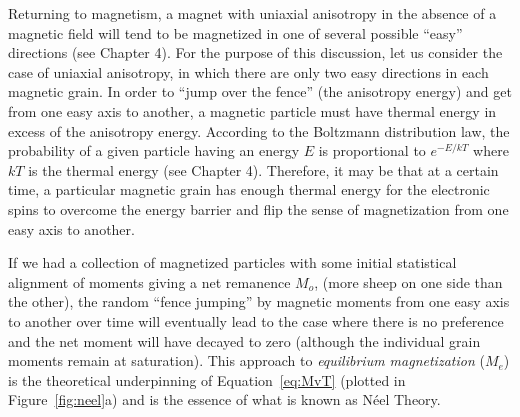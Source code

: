Returning to magnetism, a magnet with uniaxial anisotropy in the absence of a magnetic field will tend to be magnetized in one of several possible ``easy'' directions (see Chapter 4).  For the purpose of this discussion, let us consider the case of uniaxial anisotropy, in which there are only two easy directions in each magnetic grain.   In order to ``jump over the fence''  (the 
anisotropy energy) and get from one easy axis to another, a magnetic particle must have thermal energy in excess of the anisotropy energy.  According to the 
Boltzmann distribution law, the probability of a given particle having an energy $E$ is proportional to $e^{ -E/kT}$ where $kT$ is the 
thermal energy (see Chapter 4).   Therefore, it may be that at a certain time, a particular magnetic grain has enough thermal energy for the electronic spins to overcome the energy barrier and flip the sense of magnetization from one easy axis to another.  

If we had a collection of magnetized particles with some initial statistical alignment of moments giving a net remanence $M_o$, (more sheep on one side than the other),  the random ``fence jumping'' by magnetic moments from one easy axis to another over time will eventually lead to the case where there is no preference and the net  moment will have decayed to zero (although the individual grain moments remain at saturation).    This approach to 
{\it equilibrium  magnetization} ($M_e$)  is the theoretical underpinning of Equation~\ref{eq:MvT} 
 (plotted in Figure~\ref{fig:neel}a) and is the essence of what is known as
  N\'eel Theory.
  
